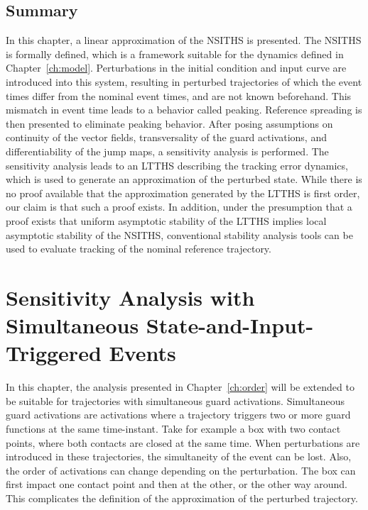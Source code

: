\documentclass[../DC2019003Bouma.tex]{subfiles}
\begin{document}
\section{Summary}
In this chapter, a linear approximation of the NSITHS is presented. The NSITHS is formally defined, which is a framework suitable for the dynamics defined in Chapter~\ref{ch:model}. Perturbations in the initial condition and input curve are introduced into this system, resulting in perturbed trajectories of which the event times differ from the nominal event times, and are not known beforehand. This mismatch in event time leads to a behavior called peaking. Reference spreading is then presented to eliminate peaking behavior. After posing assumptions on continuity of the vector fields, transversality of the guard activations, and differentiability of the jump maps, a sensitivity analysis is performed. The sensitivity analysis leads to an LTTHS describing the tracking error dynamics, which is used to generate an approximation of the perturbed state. While there is no proof available that the approximation generated by the LTTHS is first order, our claim is that such a proof exists. In addition, under the presumption that a proof exists that uniform asymptotic stability of the LTTHS implies local asymptotic stability of the NSITHS, conventional stability analysis tools can be used to evaluate tracking of the nominal reference trajectory.


\cleartooddpage
\chapter{Sensitivity Analysis with Simultaneous State-and-Input-Triggered Events}\label{ch:simult}
In this chapter, the analysis presented in Chapter~\ref{ch:order} will be extended to be suitable for trajectories with simultaneous guard activations. Simultaneous guard activations are activations where a trajectory triggers two or more guard functions at the same time-instant. Take for example a box with two contact points, where both contacts are closed at the same time. When perturbations are introduced in these trajectories, the simultaneity of the event can be lost. Also, the order of activations can change depending on the perturbation. The box can first impact one contact point and then at the other, or the other way around. This complicates the definition of the approximation of the perturbed trajectory. 
\end{document}
